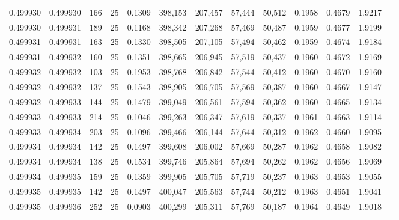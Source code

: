 \begin{tabular}{rrrrrrrrrrrrr}
0.499930 & 0.499930 & 166 &  25 &                                     0.1309 & 398,153 & 207,457 &  57,444 &  50,512 & 0.1958 & 0.4679 & 1.9217 \\
0.499930 & 0.499931 & 189 &  25 &                                     0.1168 & 398,342 & 207,268 &  57,469 &  50,487 & 0.1959 & 0.4677 & 1.9199 \\
0.499931 & 0.499931 & 163 &  25 &                                     0.1330 & 398,505 & 207,105 &  57,494 &  50,462 & 0.1959 & 0.4674 & 1.9184 \\
0.499931 & 0.499932 & 160 &  25 &                                     0.1351 & 398,665 & 206,945 &  57,519 &  50,437 & 0.1960 & 0.4672 & 1.9169 \\
0.499932 & 0.499932 & 103 &  25 &                                     0.1953 & 398,768 & 206,842 &  57,544 &  50,412 & 0.1960 & 0.4670 & 1.9160 \\
0.499932 & 0.499932 & 137 &  25 &                                     0.1543 & 398,905 & 206,705 &  57,569 &  50,387 & 0.1960 & 0.4667 & 1.9147 \\
0.499932 & 0.499933 & 144 &  25 &                                     0.1479 & 399,049 & 206,561 &  57,594 &  50,362 & 0.1960 & 0.4665 & 1.9134 \\
0.499933 & 0.499933 & 214 &  25 &                                     0.1046 & 399,263 & 206,347 &  57,619 &  50,337 & 0.1961 & 0.4663 & 1.9114 \\
0.499933 & 0.499934 & 203 &  25 &                                     0.1096 & 399,466 & 206,144 &  57,644 &  50,312 & 0.1962 & 0.4660 & 1.9095 \\
0.499934 & 0.499934 & 142 &  25 &                                     0.1497 & 399,608 & 206,002 &  57,669 &  50,287 & 0.1962 & 0.4658 & 1.9082 \\
0.499934 & 0.499934 & 138 &  25 &                                     0.1534 & 399,746 & 205,864 &  57,694 &  50,262 & 0.1962 & 0.4656 & 1.9069 \\
0.499934 & 0.499935 & 159 &  25 &                                     0.1359 & 399,905 & 205,705 &  57,719 &  50,237 & 0.1963 & 0.4653 & 1.9055 \\
0.499935 & 0.499935 & 142 &  25 &                                     0.1497 & 400,047 & 205,563 &  57,744 &  50,212 & 0.1963 & 0.4651 & 1.9041 \\
0.499935 & 0.499936 & 252 &  25 &                                     0.0903 & 400,299 & 205,311 &  57,769 &  50,187 & 0.1964 & 0.4649 & 1.9018 \\

\end{tabular}

